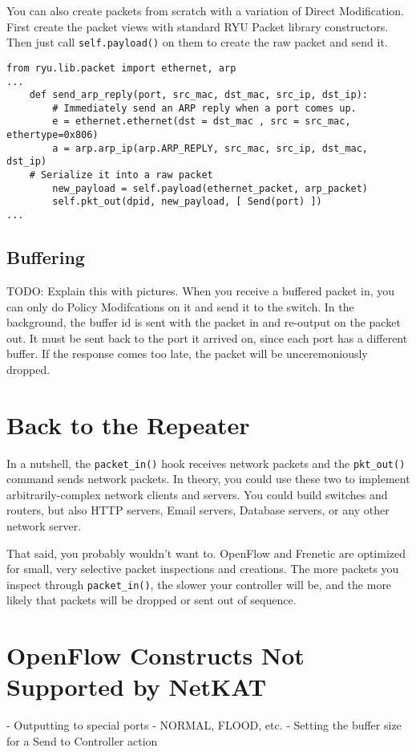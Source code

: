 You can also create packets from scratch with a variation of Direct Modification.  
First create the packet views with standard RYU Packet library constructors.
Then just call \texttt{self.payload()} on them to create the raw packet and send it.  

\begin{lstlisting}
from ryu.lib.packet import ethernet, arp
...
    def send_arp_reply(port, src_mac, dst_mac, src_ip, dst_ip):
        # Immediately send an ARP reply when a port comes up.
        e = ethernet.ethernet(dst = dst_mac , src = src_mac, ethertype=0x806)
        a = arp.arp_ip(arp.ARP_REPLY, src_mac, src_ip, dst_mac, dst_ip)
	# Serialize it into a raw packet
        new_payload = self.payload(ethernet_packet, arp_packet)
        self.pkt_out(dpid, new_payload, [ Send(port) ])	
...
\end{lstlisting}

\subsection{Buffering}

TODO: Explain this with pictures.
When you receive a buffered packet in, you can only do Policy Modifcations on it and send it
to the switch.
In the background, the buffer id is sent with the packet in and re-output on the packet out.  
It must be sent back to the port it arrived on, since each port has a different buffer.
If the response comes too late, the packet will be unceremoniously dropped.  

\section{Back to the Repeater}

In a nutshell, the \texttt{packet\_in()} hook receives network packets and the \texttt{pkt\_out()} command sends
network packets.  
In theory, you could use these two to implement arbitrarily-complex network clients and servers.  
You could build switches and routers, but also HTTP servers, Email servers, Database servers, or any other 
network server.  

That said, you probably wouldn't want to.
OpenFlow and Frenetic are optimized for small, very selective packet inspections and creations.  
The more packets you inspect through \texttt{packet\_in()}, the slower your controller will be, and
the more likely that packets will be dropped or sent out of sequence.  

\section{OpenFlow Constructs Not Supported by NetKAT}

- Outputting to special ports - NORMAL, FLOOD, etc.
- Setting the buffer size for a Send to Controller action